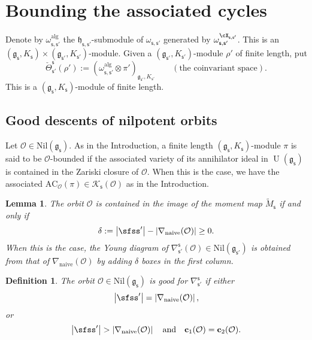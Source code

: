 \documentclass[12pt,a4paper]{amsart}
\def\abs#1{\left|{#1}\right|}
\newcommand{\CK}{{\mathcal {K}}}
\newcommand{\CO}{{\mathcal {O}}}
\newcommand{\oU}{\operatorname{U}}
\newcommand{\g}{\mathfrak g}
\newcommand{\h}{\mathfrak h}
\def\DD{\nabla}
\numberwithin{equation}{section}
\newtheorem{lem}[thm]{Lemma}
\newtheorem{defn}[thm]{Definition}
\theoremstyle{remark}
\begin{document}
\section{Bounding the associated  cycles}\label{sec:AC}


Denote by $\omega^{\mathrm{alg}}_{\mathsf s, \mathsf s'}$ the $\h_{\mathsf s, \mathsf s'}$-submodule of $\omega_{\mathsf s, \mathsf s'}$ generated by  $ \omega_{\mathsf s, \mathsf s'}^{\cX_{\mathsf s, \mathsf s'}}$. This is an $(\g_\mathsf s, K_\mathsf s)\times (\g_{\mathsf s'}, K_{\mathsf s'})$-module. Given a $ (\g_{\mathsf s'}, K_{\mathsf s'})$-module $\rho'$ of finite length,
put
\[
   \check \Theta_{\mathsf s'}^{\mathsf s}(\rho'):=(\omega^{\mathrm{alg}}_{\mathsf s, \mathsf s'}\otimes \pi')_{\g_{\mathsf s'}, K_{\mathsf s'}} \qquad (\textrm{the  coinvariant space}).
\]
This is a $(\g_{\mathsf s}, K_{\mathsf s})$-module of finite length.


\subsection{Good descents of nilpotent orbits}

Let $\CO\in \mathrm{Nil}(\g_\mathsf s)$. As in the Introduction, a finite length $(\g_{\mathsf s}, K_{\mathsf s})$-module $\pi$ is said to be $\CO$-bounded if the associated variety of its annihilator ideal in $\oU(\g_\mathsf s)$ is contained in the Zariski closure of $\CO$. When this is the case, we have the associated $\mathrm{AC}_{\CO}(\pi)\in  \CK_{\mathsf s}(\CO)$ as in the Introduction.



\begin{lem}
The orbit $\CO$ is contained in the image of the moment map $\tilde M_{\mathsf s}$ if and only if
\[
 \delta:=  \abs{\sfss'}-\abs{\DD_\mathrm{naive}(\CO)}\geq 0.
\]
When this is the case, the Young diagram of $\DD_{\mathsf s'}^{\mathsf s}(\CO)\in \mathrm{Nil}(\g_{\mathsf s'})$ is obtained from that of $\DD_\mathrm{naive}(\CO)$ by adding $\delta$ boxes in the first column.

\end{lem}

\begin{defn}
The orbit $\CO\in \mathrm{Nil}(\g_\mathsf s)$ is good for $\DD_{\mathsf s'}^{\mathsf s}$ if either
\[
\abs{\sfss'}=\abs{\DD_\mathrm{naive}(\CO)},
\]
or
\[
\abs{\sfss'}>\abs{\DD_\mathrm{naive}(\CO)} \quad \textrm{and}\quad  \mathbf c_1(\CO)=\mathbf c_2(\CO).
\]

\end{defn}
\end{document}
